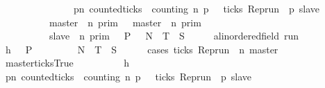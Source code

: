 \begin{isabellebody}
\ \ \ \ \ \ \ \ \ \ \ \ \ \ {\isasymlongrightarrow}\ {\isacharparenleft}{\isasymforall}p{\isasymge}n{\isachardot}\ counted{\isacharunderscore}ticks\ {\isasymrho}\ counting\ n\ p\ {}\ {\isasymlongrightarrow}\ ticks\ {\isacharparenleft}Rep{\isacharunderscore}run\ {\isasymrho}\ p\ slave{\isacharparenright}{\isacharparenright}{\isacharbraceright}\isanewline
\ \ \ \ \ \ \ \ {\isacharequal}\ {\isasymlbrakk}\ master\ {\isasymnot}{\isasymUp}\ n\ {\isasymrbrakk}\isactrlsub p\isactrlsub r\isactrlsub i\isactrlsub m\ {\isasymunion}\ {\isasymlbrakk}\ master\ {\isasymUp}\ n\ {\isasymrbrakk}\isactrlsub p\isactrlsub r\isactrlsub i\isactrlsub m\isanewline
\ \ \ \ \ \ \ \ {\isasyminter}\ {\isasymlbrakk}\ slave\ {\isasymUp}\ n\ {\isasymrbrakk}\isactrlsub p\isactrlsub r\isactrlsub i\isactrlsub m{\isacartoucheclose}\ {\isacharparenleft}\ {\isacartoucheopen}{\isacharbraceleft}{\isasymrho}{\isachardot}\ {\isacharquery}P\ {\isasymrho}{\isacharbraceright}\ {\isacharequal}\ {\isacharquery}N\ {\isasymunion}\ {\isacharquery}T\ {\isasyminter}\ {\isacharquery}S{\isacartoucheclose}{\isacharparenright}\isanewline
%
\isadelimproof
%
\endisadelimproof
%
\isatagproof
{}\isamarkupfalse%
\isanewline
\ \ \isacommand{{\isacharbraceleft}}\isamarkupfalse%
\ \isamarkupfalse%
\ {\isasymrho}{\isacharcolon}{\isacharcolon}{\isacartoucheopen}{\isacharparenleft}{\isacharprime}a{\isacharcolon}{\isacharcolon}linordered{\isacharunderscore}field{\isacharparenright}\ run{\isacartoucheclose}\isanewline
\ \ \ \ \isamarkupfalse%
\ h{\isacharcolon}{\isacartoucheopen}{\isasymrho}\ {\isasymin}\ {\isacharbraceleft}{\isasymrho}{\isachardot}\ {\isacharquery}P\ {\isasymrho}{\isacharbraceright}{\isacartoucheclose}\isanewline
\ \ \ \ \isamarkupfalse%
\ {\isacartoucheopen}{\isasymrho}\ {\isasymin}\ {\isacharquery}N\ {\isasymunion}\ {\isacharquery}T\ {\isasyminter}\ {\isacharquery}S{\isacartoucheclose}\isanewline
\ \ \ \ \isamarkupfalse%
\ {\isacharparenleft}cases\ {\isacartoucheopen}ticks\ {\isacharparenleft}Rep{\isacharunderscore}run\ {\isasymrho}\ n\ master{\isacharparenright}{\isacartoucheclose}{\isacharparenright}\isanewline
\ \ \ \ \ \ \isamarkupfalse%
\ master{\isacharunderscore}ticks{\isacharcolon}True\isanewline
\ \ \ \ \ \ \ \ \isamarkupfalse%
\ h\ \isamarkupfalse%
\ {\isacartoucheopen}{\isacharparenleft}{\isasymforall}p{\isasymge}n{\isachardot}\ counted{\isacharunderscore}ticks\ {\isasymrho}\ counting\ n\ p\ {}\ {\isasymlongrightarrow}\ ticks\ {\isacharparenleft}Rep{\isacharunderscore}run\ {\isasymrho}\ p\ slave{\isacharparenright}{\isacharparenright}{\isacartoucheclose}\ \isamarkupfalse%

\end{isabellebody}
